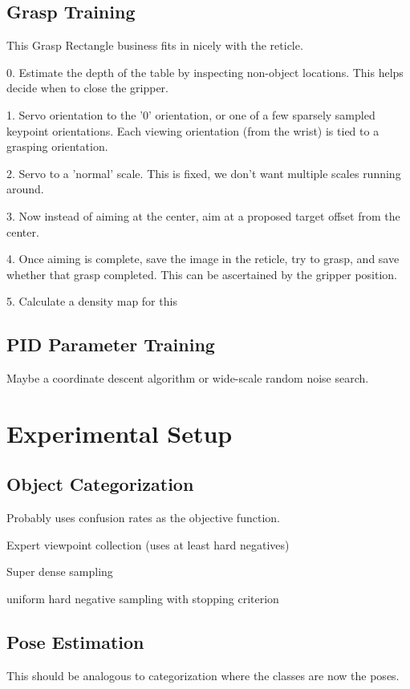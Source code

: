 \documentclass[conference]{IEEEtran}
\begin{document}
\subsection{Grasp Training}
This Grasp Rectangle business fits in nicely with the reticle.

0. Estimate the depth of the table by inspecting non-object locations. This helps decide when to close the gripper.

1. Servo orientation to the '0' orientation, or one of a few sparsely sampled keypoint orientations.
Each viewing orientation (from the wrist) is tied to a grasping orientation.

2. Servo to a 'normal' scale. This is fixed, we don't want multiple scales running around.

3. Now instead of aiming at the center, aim at a proposed target offset from the center.

4. Once aiming is complete, save the image in the reticle, try to grasp, and save whether that grasp completed.
This can be ascertained by the gripper position.

5. Calculate a density map for this 

\subsection{PID Parameter Training}
Maybe a coordinate descent algorithm or wide-scale random noise search.


\section{Experimental Setup}

\subsection{Object Categorization}
Probably uses confusion rates as the objective function.

Expert viewpoint collection (uses at least hard negatives)

Super dense sampling

uniform hard negative sampling with stopping criterion

\subsection{Pose Estimation}
This should be analogous to categorization where the classes
are now the poses.
\end{document}

